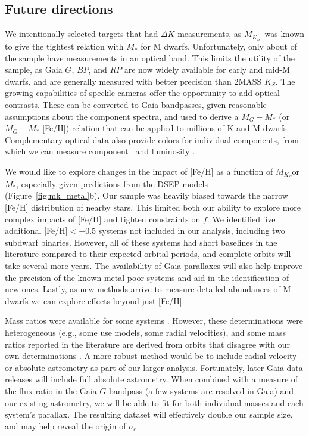 \documentclass[twocolumn]{aastex62}
\newcommand{\mks}{$M_{K_S}$}
\begin{document}
\subsection{Future directions}

We intentionally selected targets that had $\Delta K$ measurements, as \mks\ was known to give the tightest relation with $M_*$ for M dwarfs. Unfortunately, only about  of the sample have measurements in an optical band. This limits the utility of the sample, as Gaia $G$, $BP$, and $RP$ are now widely available for early and mid-M dwarfs, and are generally measured with better precision than 2MASS $K_S$. The growing capabilities of speckle cameras \citep[e.g.,][]{2009AJ....137.5057H} offer the opportunity to add optical contrasts. These can be converted to Gaia bandpasses, given reasonable assumptions about the component spectra, and used to derive a $M_{G}-M_*$ (or $M_G-M_*$-[Fe/H]) relation that can be applied to millions of K and M dwarfs. Complementary optical data also provide colors for individual components, from which we can measure component \teff\ and luminosity \citep[e.g.,][]{2017ApJ...845...72K}.

We would like to explore changes in the impact of [Fe/H] as a function of \mks or $M_*$, especially given predictions from the DSEP models (Figure~\ref{fig:mk_metal}b). Our sample was heavily biased towards the narrow [Fe/H] distribution of nearby stars. This limited both our ability to explore more complex impacts of [Fe/H] and tighten constraints on $f$. We identified five additional [Fe/H]$<-0.5$ systems not included in our analysis, including two subdwarf binaries. However, all of these systems had short baselines in the literature compared to their expected orbital periods, and complete orbits will take several more years. The availability of Gaia parallaxes will also help improve the precision of the known metal-poor systems and aid in the identification of new ones. Lastly, as new methods arrive to measure detailed abundances of M dwarfs \citep{Veyette2016a,Veyette2017} we can explore effects beyond just [Fe/H]. %

Mass ratios were available for some systems  \citep[e.g.,][]{Soderhjelm1999,Mlg2007b,Dupuy2017}. However, these determinations were heterogeneous (e.g., some use models, some radial velocities), and some mass ratios reported in the literature are derived from orbits that disagree with our own determinations \citep[e.g.,][]{Koh2012}. A more robust method would be to include radial velocity or absolute astrometry as part of our larger analysis. Fortunately, later Gaia data releases will include full absolute astrometry. When combined with a measure of the flux ratio in the Gaia $G$ bandpass (a few systems are resolved in Gaia) and our existing astrometry, we will be able to fit for both individual masses and each system's parallax. The resulting dataset will effectively double our sample size, and may help reveal the origin of $\sigma_e$. 
\end{document}
